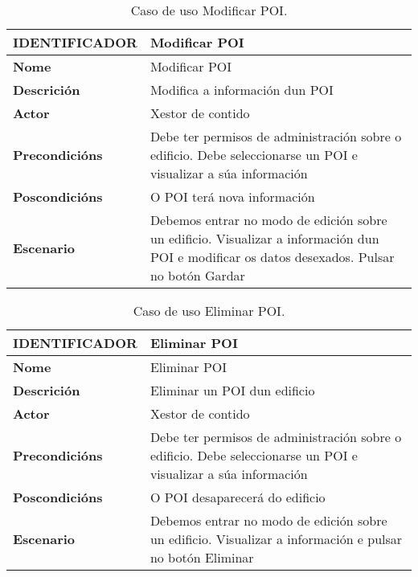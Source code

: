 \begin{table}[tbh]
	\footnotesize
	\centering
	\begin{tabular}{|l|p{10cm}|}
		\hline 
		\textbf{IDENTIFICADOR}	& \textbf{Modificar POI} \\ 
		\hline 
		\textbf{Nome} & Modificar POI \\ 
		\hline 
		\textbf{Descrición} & Modifica a información dun POI \\ 
		\hline 
		\textbf{Actor} & Xestor de contido \\ 
		\hline 
		\textbf{Precondicións} &  Debe ter permisos de administración sobre o edificio. Debe seleccionarse un POI e visualizar a súa información \\ 
		\hline 
		\textbf{Poscondicións} & O POI terá nova información \\ 
		\hline 
		\textbf{Escenario} & Debemos entrar no modo de edición sobre un edificio. Visualizar a información dun POI e modificar os datos desexados. Pulsar no botón Gardar \\ 
		\hline 
	\end{tabular}
	\caption{Caso de uso Modificar POI.}
	\label{tab:cuModificarPOI}
\end{table}

\begin{table}[tbh]
	\footnotesize
	\centering
	\begin{tabular}{|l|p{10cm}|}
		\hline 
		\textbf{IDENTIFICADOR}	& \textbf{Eliminar POI} \\ 
		\hline 
		\textbf{Nome} & Eliminar POI \\ 
		\hline 
		\textbf{Descrición} & Eliminar un POI dun edificio \\ 
		\hline 
		\textbf{Actor} & Xestor de contido \\ 
		\hline 
		\textbf{Precondicións} & Debe ter permisos de administración sobre o edificio. Debe seleccionarse un POI e visualizar a súa información \\ 
		\hline 
		\textbf{Poscondicións} & O POI desaparecerá do edificio \\ 
		\hline 
		\textbf{Escenario} & Debemos entrar no modo de edición sobre un edificio. Visualizar a información e pulsar no botón Eliminar \\ 
		\hline 
	\end{tabular}
	\caption{Caso de uso Eliminar POI.}
	\label{tab:cuEliminarPOI}
\end{table}

